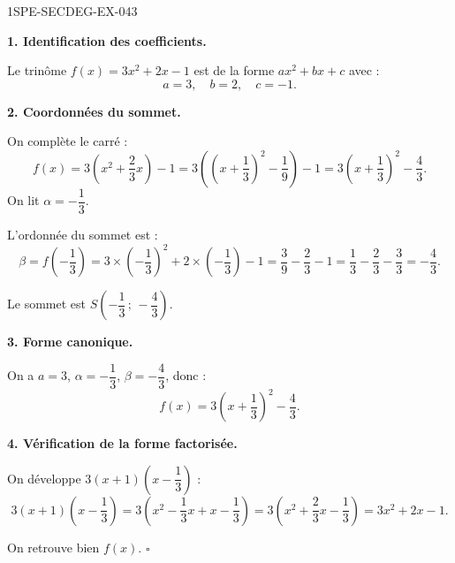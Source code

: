 \begin{corrige}{1SPE-SECDEG-EX-043}

\textbf{1. Identification des coefficients.}


Le trinôme $f(x) = 3x^2 + 2x - 1$ est de la forme $ax^2 + bx + c$ avec :
\[a = 3, \quad b = 2, \quad c = -1.\]

\medskip
\textbf{2. Coordonnées du sommet.}


On complète le carré :
\[f(x)=3\left(x^2+\frac{2}{3}x\right)-1=3\left(\left(x+\frac{1}{3}\right)^2-\frac{1}{9}\right)-1=3\left(x+\frac{1}{3}\right)^2-\frac{4}{3}.\]
On lit $\alpha=-\dfrac{1}{3}$.

L'ordonnée du sommet est :
\[\beta = f\!\left(-\frac{1}{3}\right) = 3\times\left(-\frac{1}{3}\right)^2 + 2\times\left(-\frac{1}{3}\right) - 1 = \frac{3}{9} - \frac{2}{3} - 1 = \frac{1}{3} - \frac{2}{3} - \frac{3}{3} = -\frac{4}{3}.\]

Le sommet est $S\!\left(-\dfrac{1}{3}\,;\,-\dfrac{4}{3}\right)$.

\medskip
\textbf{3. Forme canonique.}


On a $a = 3$, $\alpha = -\dfrac{1}{3}$, $\beta = -\dfrac{4}{3}$, donc :
\[f(x) = 3\left(x + \frac{1}{3}\right)^2 - \frac{4}{3}.\]

\medskip
\textbf{4. Vérification de la forme factorisée.}


On développe $3\!\left(x+1\right)\!\left(x - \dfrac{1}{3}\right)$ :
\[3\!\left(x+1\right)\!\left(x - \frac{1}{3}\right) = 3\!\left(x^2 - \frac{1}{3}x + x - \frac{1}{3}\right) = 3\!\left(x^2 + \frac{2}{3}x - \frac{1}{3}\right) = 3x^2 + 2x - 1.\]

On retrouve bien $f(x)$. \hfill $\square$

\end{corrige}
